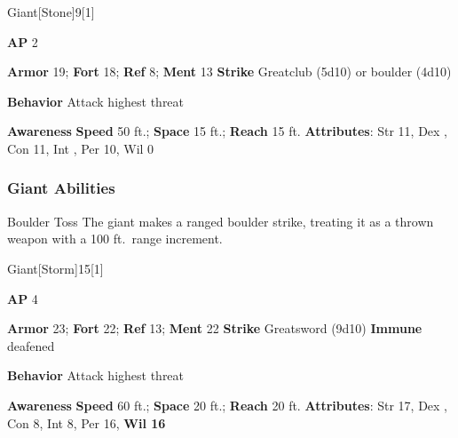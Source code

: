 \begin{monsection}{Giant}[Stone]{9}[1]
\vspace{-1em}\vspace{-1em}
\begin{spellcontent}
\begin{spelltargetinginfo}
{\textbf{AP} 2}

\pari \textbf{Armor} 19;
\textbf{Fort} 18;
\textbf{Ref} 8;
\textbf{Ment} 13
\pari \textbf{Strike} Greatclub  (5d10) or boulder  (4d10)



\pari \textbf{Behavior} Attack highest threat
\end{spelltargetinginfo}
\end{spellcontent}

\begin{monsterfooter}
\pari \textbf{Awareness} 
\pari \textbf{Speed} 50 ft.;
\textbf{Space} 15 ft.;
\textbf{Reach} 15 ft.
\pari \textbf{Attributes}:
Str 11,
Dex ,
Con 11,
Int ,
Per 10,
Wil 0
\end{monsterfooter}
\end{monsection}


\subsubsection{Giant Abilities}

\begin{freeability}{Boulder Toss}
The giant makes a ranged boulder strike, treating it as a thrown weapon with a 100 ft.\ range increment.
\end{freeability}

\begin{monsection}{Giant}[Storm]{15}[1]
\vspace{-1em}\vspace{-1em}
\begin{spellcontent}
\begin{spelltargetinginfo}
{\textbf{AP} 4}

\pari \textbf{Armor} 23;
\textbf{Fort} 22;
\textbf{Ref} 13;
\textbf{Ment} 22
\pari \textbf{Strike} Greatsword  (9d10)
\pari \textbf{Immune} deafened


\pari \textbf{Behavior} Attack highest threat
\end{spelltargetinginfo}
\end{spellcontent}

\begin{monsterfooter}
\pari \textbf{Awareness} 
\pari \textbf{Speed} 60 ft.;
\textbf{Space} 20 ft.;
\textbf{Reach} 20 ft.
\pari \textbf{Attributes}:
Str 17,
Dex ,
Con 8,
Int 8,
Per 16,
\textbf{Wil 16}
\end{monsterfooter}
\end{monsection}


